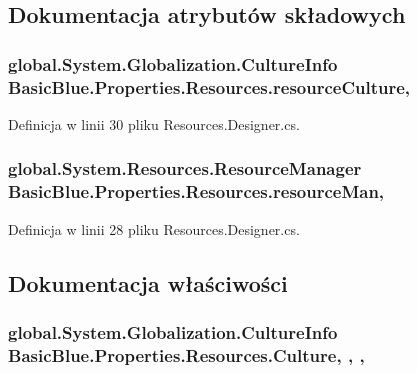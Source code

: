 \subsection{Dokumentacja atrybutów składowych}
\hypertarget{class_basic_blue_1_1_properties_1_1_resources_a5b3b3b7485c5e431451c704aadb57b56}{
\subsubsection[{resource\-Culture}]{\setlength{\rightskip}{0pt plus 5cm}global.\-System.\-Globalization.\-Culture\-Info Basic\-Blue.\-Properties.\-Resources.\-resource\-Culture\hspace{0.3cm}{\ttfamily [static]}, {\ttfamily [private]}}}\label{class_basic_blue_1_1_properties_1_1_resources_a5b3b3b7485c5e431451c704aadb57b56}


Definicja w linii 30 pliku Resources.\-Designer.\-cs.

\hypertarget{class_basic_blue_1_1_properties_1_1_resources_a05e3af121eb2bc24cf3d49387fcb1810}{
\subsubsection[{resource\-Man}]{\setlength{\rightskip}{0pt plus 5cm}global.\-System.\-Resources.\-Resource\-Manager Basic\-Blue.\-Properties.\-Resources.\-resource\-Man\hspace{0.3cm}{\ttfamily [static]}, {\ttfamily [private]}}}\label{class_basic_blue_1_1_properties_1_1_resources_a05e3af121eb2bc24cf3d49387fcb1810}


Definicja w linii 28 pliku Resources.\-Designer.\-cs.



\subsection{Dokumentacja właściwości}
\hypertarget{class_basic_blue_1_1_properties_1_1_resources_ab550a13a4784e500d0181ad0f9ed96c3}{
\subsubsection[{Culture}]{\setlength{\rightskip}{0pt plus 5cm}global.\-System.\-Globalization.\-Culture\-Info Basic\-Blue.\-Properties.\-Resources.\-Culture\hspace{0.3cm}{\ttfamily [static]}, {\ttfamily [get]}, {\ttfamily [set]}, {\ttfamily [package]}}}\label{class_basic_blue_1_1_properties_1_1_resources_ab550a13a4784e500d0181ad0f9ed96c3}


